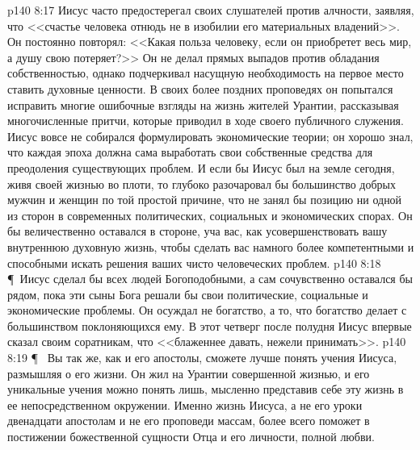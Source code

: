 \vs p140 8:17 Иисус часто предостерегал своих слушателей против алчности, заявляя, что <<счастье человека отнюдь не в изобилии его материальных владений>>. Он постоянно повторял: <<Какая польза человеку, если он приобретет весь мир, а душу свою потеряет?>> Он не делал прямых выпадов против обладания собственностью, однако подчеркивал насущную необходимость на первое место ставить духовные ценности. В своих более поздних проповедях он попытался исправить многие ошибочные взгляды на жизнь жителей Урантии, рассказывая многочисленные притчи, которые приводил в ходе своего публичного служения. Иисус вовсе не собирался формулировать экономические теории; он хорошо знал, что каждая эпоха должна сама выработать свои собственные средства для преодоления существующих проблем. И если бы Иисус был на земле сегодня, живя своей жизнью во плоти, то глубоко разочаровал бы большинство добрых мужчин и женщин по той простой причине, что не занял бы позицию ни одной из сторон в современных политических, социальных и экономических спорах. Он бы величественно оставался в стороне, уча вас, как усовершенствовать вашу внутреннюю духовную жизнь, чтобы сделать вас намного более компетентными и способными искать решения ваших чисто человеческих проблем.
\vs p140 8:18 \P\ Иисус сделал бы всех людей Богоподобными, а сам сочувственно оставался бы рядом, пока эти сыны Бога решали бы свои политические, социальные и экономические проблемы. Он осуждал не богатство, а то, что богатство делает с большинством поклоняющихся ему. В этот четверг после полудня Иисус впервые сказал своим соратникам, что <<блаженнее давать, нежели принимать>>.
\vs p140 8:19 \P\ \bibnobreakspace {} Вы так же, как и его апостолы, сможете лучше понять учения Иисуса, размышляя о его жизни. Он жил на Урантии совершенной жизнью, и его уникальные учения можно понять лишь, мысленно представив себе эту жизнь в ее непосредственном окружении. Именно жизнь Иисуса, а не его уроки двенадцати апостолам и не его проповеди массам, более всего поможет в постижении божественной сущности Отца и его личности, полной любви.
